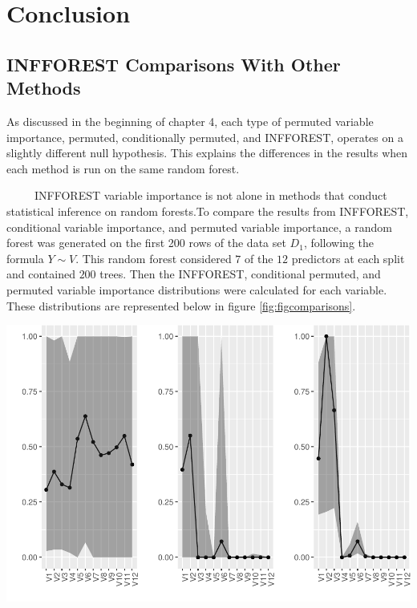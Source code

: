 \documentclass[12pt,twoside]{reedthesis}
\let\origfigure\figure
\let\endorigfigure\endfigure
\renewenvironment{figure}[1][2] {
    \expandafter\origfigure\expandafter[H]
} {
    \endorigfigure
}
\begin{document}
  \chapter{Conclusion}\label{conclusion}
  
  \section{INFFOREST Comparisons With Other
  Methods}\label{infforest-comparisons-with-other-methods}
  
  As discussed in the beginning of chapter 4, each type of permuted
  variable importance, permuted, conditionally permuted, and INFFOREST,
  operates on a slightly different null hypothesis. This explains the
  differences in the results when each method is run on the same random
  forest.
  
  ~~~~~INFFOREST variable importance is not alone in methods that conduct
  statistical inference on random forests.To compare the results from
  INFFOREST, conditional variable importance, and permuted variable
  importance, a random forest was generated on the first 200 rows of the
  data set \(D_1\), following the formula \(Y \sim V\). This random forest
  considered \(7\) of the \(12\) predictors at each split and contained
  \(200\) trees. Then the INFFOREST, conditional permuted, and permuted
  variable importance distributions were calculated for each variable.
  These distributions are represented below in figure
  \ref{fig:figcomparisons}.
  
  \begin{figure}[htbp]
  \centering
  \includegraphics{Thesis_files/figure-latex/unnamed-chunk-28-1.pdf}
  \caption{\label{fig:unnamed-chunk-28}\label{fig:figcomparisons}Median Values
  of INFFOREST, Conditionally Permuted, and Permuted Variable Importance}
  \end{figure}
  
\end{document}
